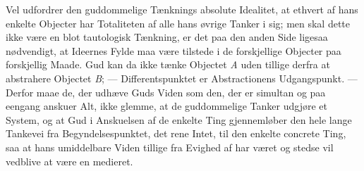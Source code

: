 \documentclass[12pt]{book}
\begin{document}
Vel udfordrer den guddommelige Tænknings absolute Idealitet, at ethvert af hans
enkelte Objecter har Totaliteten af alle hans øvrige Tanker i sig; men skal
dette ikke være en blot tautologisk Tænkning, er det paa den anden Side ligesaa
nødvendigt, at Ideernes Fylde maa være tilstede i de forskjellige Objecter paa
forskjellig Maade. Gud kan da ikke tænke Objectet \textit{A} uden tillige
derfra at abstrahere Objectet \textit{B}; --- Differentspunktet er
Abstractionens Udgangspunkt. --- Derfor maae de, der udhæve Guds Viden som den,
der er simultan og paa eengang anskuer Alt, ikke glemme, at de guddommelige
Tanker udgjøre et System, og at Gud i Anskuelsen af de enkelte Ting
gjennemløber den hele lange Tankevei fra Begyndelsespunktet, det rene Intet,
til den enkelte concrete Ting, saa at hans umiddelbare Viden tillige fra
Evighed af har været og stedse vil vedblive at være en medieret.
\end{document}
